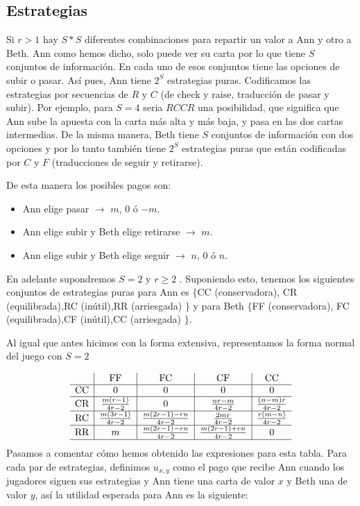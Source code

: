 \documentclass[12pt,a4paper,]{book}
\numberwithin{dummy}{section}
\theoremstyle{ocrenumbox}
\theoremstyle{blacknumex}
\theoremstyle{blacknumbox}
\theoremstyle{ocrenum}
\theoremstyle{ocrenum}
\begin{document}
\hypertarget{Seccion511}{%
\subsection{Estrategias}\label{Seccion511}}

Si \(r>1\) hay \(S*S\) diferentes combinaciones para repartir un valor a
Ann y otro a Beth. Ann como hemos dicho, solo puede ver su carta por lo
que tiene \(S\) conjuntos de información. En cada uno de esos conjuntos
tiene las opciones de subir o pasar. Así pues, Ann tiene \(2^S\)
estrategias puras. Codificamos las estrategias por secuencias de \(R\) y
\(C\) (de check y raise, traducción de pasar y subir). Por ejemplo, para
\(S=4\) seria \(RCCR\) una posibilidad, que significa que Ann sube la
apuesta con la carta más alta y más baja, y pasa en las dos cartas
intermedias. De la misma manera, Beth tiene \(S\) conjuntos de
información con dos opciones y por lo tanto también tiene \(2^S\)
estrategias puras que están codificadas por \(C\) y \(F\) (traducciones
de seguir y retirarse).

De esta manera los posibles pagos son:

\begin{itemize}
\item
  Ann elige pasar \(\rightarrow\) \(m\), \(0\) ó \(-m\).
\item
  Ann elige subir y Beth elige retirarse \(\rightarrow\) \(m\).
\item
  Ann elige subir y Beth elige seguir \(\rightarrow\) \(n\), \(0\) ó
  \(n\).
\end{itemize}

En adelante supondremos \(S=2\) y \(r \geq 2\) . Suponiendo esto,
tenemos los siguientes conjuntos de estrategias puras para Ann es
\(\{\)CC (conservadora), CR (equilibrada),RC (inútil),RR (arriesgada)
\(\}\) y para Beth \(\{\)FF (conservadora), FC (equilibrada),CF
(inútil),CC (arriesgada) \(\}\).

Al igual que antes hicimos con la forma extensiva, representamos la
forma normal del juego con \(S=2\)

\[
\begin{array}{c|c|c|c|c}
 & \text{FF} & \text{FC} & \text{CF} & \text{CC} \\
\hline
\text{CC} & 0 & 0 & 0 & 0 \\
\hline
\text{CR} & \frac{m(r-1)}{4r-2} & 0 & \frac{nr-m}{4r-2} & \frac{(n-m)r}{4r-2} \\
\hline
\text{RC} & \frac{m(3r-1)}{4r-2} & \frac{m(2r-1)-rn}{4r-2} & \frac{2mr}{4r-2} & \frac{r(m-n)}{4r-2}  \\
\hline
\text{RR} & m & \frac{m(2r-1)-rn}{4r-2} & \frac{m(2r-1)+rn}{4r-2} & 0 \\
\hline
\end{array}
\] Pasamos a comentar cómo hemos obtenido las expresiones para esta
tabla. Para cada par de estrategias, definimos \(u_{x,y}\) como el pago
que recibe Ann cuando los jugadores siguen sus estrategias y Ann tiene
una carta de valor \(x\) y Beth una de valor \(y\), así la utilidad
esperada para Ann es la siguiente:
\end{document}
